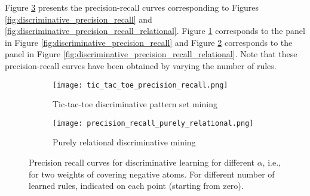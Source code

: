 Figure \ref{fig:precision_recall_curves} presents the precision-recall curves corresponding to Figures \ref{fig:discriminative_precision_recall} and \ref{fig:discriminative_precision_recall_relational}. Figure \ref{fig:tic_tac_toe_precision_recall_curce} corresponds to the panel in Figure \ref{fig:discriminative_precision_recall} and Figure \ref{fig:relational_precision_recall_curve} corresponds to the panel in Figure \ref{fig:discriminative_precision_recall_relational}. Note that these precision-recall curves have been obtained by varying the number of rules.

\begin{figure}[thb]
\begin{center}
\begin{subfigure}{.49\textwidth}
  \captionsetup{skip = 2pt}
  \texttt{[image: tic\_tac\_toe\_precision\_recall.png]}
  \captionsetup{skip = -6pt}
  \caption{Tic-tac-toe discriminative pattern set mining}
  \label{fig:tic_tac_toe_precision_recall_curce}
\end{subfigure}
   \hfill 
\begin{subfigure}{.49\textwidth}
  \captionsetup{skip = 2pt}
  \texttt{[image: precision\_recall\_purely\_relational.png]}
  \captionsetup{skip = -6pt}
  \caption{Purely relational discriminative mining}
  \label{fig:relational_precision_recall_curve}
 \end{subfigure}
 \end{center}
  \captionsetup{skip = -6pt}
  \caption{Precision recall curves for discriminative learning for different $\alpha$, i.e., for two weights of covering negative atoms. For different number of learned rules, indicated on each point (starting from zero).}
  \label{fig:precision_recall_curves}
\end{figure}

